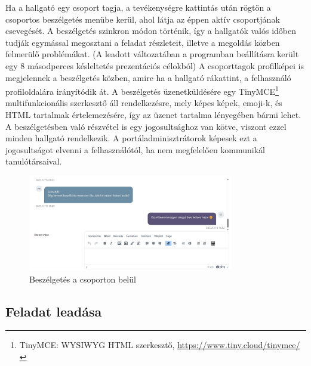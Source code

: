 Ha a hallgató egy csoport tagja, a tevékenységre kattintás után rögtön a csoportos beszélgetés menübe kerül, ahol látja az éppen aktív csoportjának csevegését. A beszélgetés szinkron módon történik, így a hallgatók valós időben tudják egymással megosztani a feladat részleteit, illetve a megoldás közben felmerülő problémákat. (A leadott változatában a programban beállításra került egy 8 másodperces késleltetés prezentációs célokból) A csoporttagok profilképei is megjelennek a beszélgetés közben, amire ha a hallgató rákattint, a felhasználó profiloldalára irányítódik át. A beszélgetés üzenetküldésére egy TinyMCE\footnote{TinyMCE: WYSIWYG HTML szerkesztő, \url{https://www.tiny.cloud/tinymce/}} multifunkcionális szerkesztő áll rendelkezésre, mely képes képek, emoji-k, és HTML tartalmak értelemezésére, így az üzenet tartalma lényegében bármi lehet. A beszélgetésben való részvétel is egy jogosultsághoz van kötve, viszont ezzel minden hallgató rendelkezik. A portáladminisztrátorok képesek ezt a jogosultságot elvenni a felhasználótól, ha nem megfelelően kommunikál tanulótársaival.
\begin{figure}[H]
	\centering
	\includegraphics[width=0.8\textwidth, frame]{images/uzenet.png}
	\caption{Beszélgetés a csoporton belül}
\end{figure}

\subsection{Feladat leadása}

